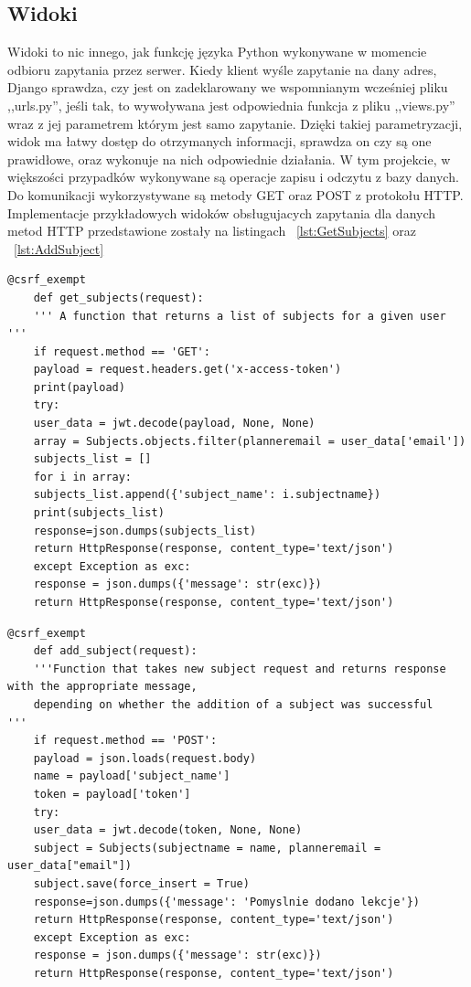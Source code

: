 \subsection{Widoki}
Widoki to nic innego, jak funkcję języka Python wykonywane w momencie odbioru zapytania przez serwer. Kiedy klient wyśle zapytanie na dany adres, Django sprawdza, czy jest on zadeklarowany we wspomnianym wcześniej pliku ,,urls.py'', jeśli tak, to wywoływana jest odpowiednia funkcja z pliku ,,views.py'' wraz z jej parametrem którym jest samo zapytanie. Dzięki takiej parametryzacji, widok ma łatwy dostęp do otrzymanych informacji, sprawdza on czy są one prawidłowe, oraz wykonuje na nich odpowiednie działania. W tym projekcie, w większości przypadków wykonywane są operacje zapisu i odczytu z bazy danych. Do komunikacji wykorzystywane są metody GET oraz POST z protokołu HTTP.
Implementacje przykładowych widoków obsługujacych zapytania dla danych metod HTTP przedstawione zostały na listingach ~\ref{lst:GetSubjects} oraz ~\ref{lst:AddSubject}
\begin{lstlisting}[caption=Widok obsługujący zapytanie typu GET, label={lst:GetSubjects}]
	@csrf_exempt
	def get_subjects(request):
	''' A function that returns a list of subjects for a given user  '''
	if request.method == 'GET':
	payload = request.headers.get('x-access-token')
	print(payload)
	try:
	user_data = jwt.decode(payload, None, None)
	array = Subjects.objects.filter(planneremail = user_data['email'])
	subjects_list = []
	for i in array:
	subjects_list.append({'subject_name': i.subjectname})
	print(subjects_list)
	response=json.dumps(subjects_list)
	return HttpResponse(response, content_type='text/json')
	except Exception as exc:
	response = json.dumps({'message': str(exc)})
	return HttpResponse(response, content_type='text/json')
\end{lstlisting}

\begin{lstlisting}[caption=Widok obsługujący zapytanie typu POST, label={lst:AddSubject}]
	@csrf_exempt
	def add_subject(request):
	'''Function that takes new subject request and returns response with the appropriate message,
	depending on whether the addition of a subject was successful    '''
	if request.method == 'POST':
	payload = json.loads(request.body)
	name = payload['subject_name']
	token = payload['token']
	try:
	user_data = jwt.decode(token, None, None)
	subject = Subjects(subjectname = name, planneremail = user_data["email"])
	subject.save(force_insert = True)
	response=json.dumps({'message': 'Pomyslnie dodano lekcje'})
	return HttpResponse(response, content_type='text/json')
	except Exception as exc:
	response = json.dumps({'message': str(exc)})
	return HttpResponse(response, content_type='text/json')
\end{lstlisting}

